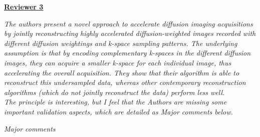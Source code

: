 \documentclass[a4paper,11pt,twoside]{report}
\begin{document}
\clearpage
\noindent \underline{\textbf{Reviewer 3}}

\textit{The authors present a novel approach to accelerate diffusion imaging acquisitions by jointly reconstructing highly accelerated diffusion-weighted images recorded with different diffusion weightings and k-space sampling patterns. The underlying assumption is that by encoding complementary k-spaces in the different diffusion images, they can acquire a smaller k-space for each individual image, thus accelerating the overall acquisition. They show that their algorithm is able to reconstruct this undersampled data, whereas other contemporary reconstruction algorithms (which do not jointly reconstruct the data) perform less well.\\
\indent The principle is interesting, but I feel that the Authors are missing some important validation aspects, which are detailed as Major comments below.}

\vspace{1em}

\noindent \textit{Major comments}
\end{document}
